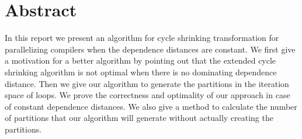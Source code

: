 \chapter*{Abstract}
In this report we present an algorithm for cycle shrinking transformation for parallelizing compilers when the dependence distances are constant. We first give a motivation for a better algorithm by pointing out that the extended cycle shrinking algorithm is not optimal when there is no dominating dependence distance. Then we give our algorithm to generate the partitions in the iteration space of loops. We prove the correctness and optimality of our approach in case of constant dependence distances. We also give a method to calculate the number of partitions that our algorithm will generate without actually creating the partitions.
